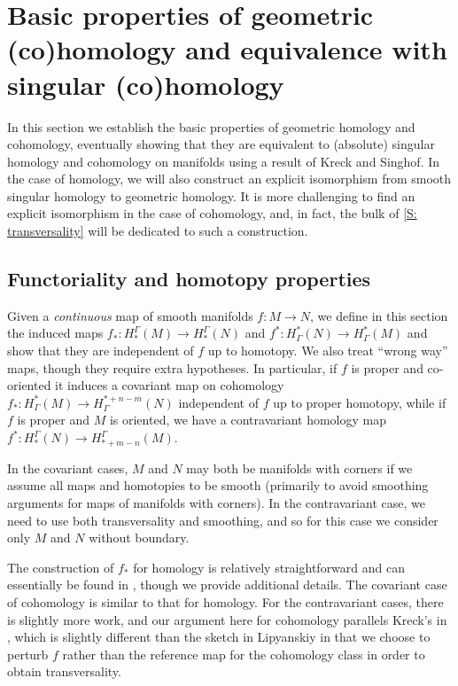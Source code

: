 
\section{Basic properties of geometric (co)homology and equivalence with singular (co)homology}\label{S: basic properties}

In this section we establish the basic properties of geometric homology and cohomology, eventually showing that they are equivalent to (absolute) singular homology and cohomology on manifolds using a result of Kreck and Singhof.
In the case of homology, we will also construct an explicit isomorphism from smooth singular homology to geometric homology. 
It is more challenging to find an explicit isomorphism in the case of cohomology, and, in fact, the bulk of \cref{S: transversality} will be dedicated to such a construction.

\subsection{Functoriality and homotopy properties}\label{S: functoriality}

Given a \textit{continuous} map of smooth manifolds $f \colon M \to N$, we define in this section the induced maps $f_* \colon H_*^\Gamma(M) \to H_*^\Gamma(N)$ and $f^* \colon H^*_\Gamma(N) \to H^*_\Gamma(M)$ and show that they are independent of $f$ up to homotopy.
We also treat ``wrong way'' maps, though they require extra hypotheses.
In particular, if $f$ is proper and co-oriented it induces a covariant map on cohomology $f_* \colon H^*_\Gamma(M) \to H^{*+n-m}_\Gamma(N)$ independent of $f$ up to proper homotopy, 
while if $f$ is proper and $M$ is oriented, we have a contravariant homology map $f^* \colon H_*^\Gamma(N) \to H_{*+m-n}^\Gamma(M)$.

In the covariant cases, $M$ and $N$ may both be manifolds with corners if we assume all maps and homotopies to be smooth (primarily to avoid smoothing arguments for maps of manifolds with corners).
In the contravariant case, we need to use both transversality and smoothing, and so for this case we consider only $M$ and $N$ without boundary.

The construction of $f_*$ for homology is relatively straightforward and can essentially be found in \cite[Section 6]{Lipy14}, though we provide additional details.
The covariant case of cohomology is similar to that for homology.
For the contravariant cases, there is slightly more work, and our argument here for cohomology parallels Kreck's in \cite{Krec10}, which is slightly different than the sketch in Lipyanskiy \cite[Section 6]{Lipy14} in that we choose to perturb $f$ rather than the reference map for the cohomology class in order to obtain transversality.

